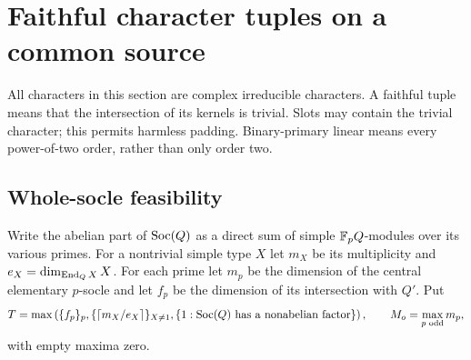 \section{Faithful character tuples on a common source}\label{sec:characters}
All characters in this section are complex irreducible characters. A
faithful tuple means that the intersection of its kernels is trivial.
Slots may contain the trivial character; this permits harmless padding.
Binary-primary linear means every power-of-two order, rather than only
order two.

\subsection{Whole-socle feasibility}
Write the abelian part of $\operatorname{Soc}(Q)$ as a direct sum of simple
$\mathbb F_pQ$-modules over its various primes. For a nontrivial simple type
$X$ let $m_X$ be its multiplicity and
$e_X=\dim_{\operatorname{End}_QX}X$. For each prime let $m_p$ be the dimension of
the central elementary $p$-socle and let $f_p$ be the dimension of its
intersection with $Q'$. Put
\[
 T=\max\left(\{f_p\}_p,
       \{\lceil m_X/e_X\rceil\}_{X\ne1},
       \{1:\operatorname{Soc}(Q)\text{ has a nonabelian factor}\}\right),
 \qquad M_o=\max_{p\text{ odd}}m_p,
\]
with empty maxima zero.

